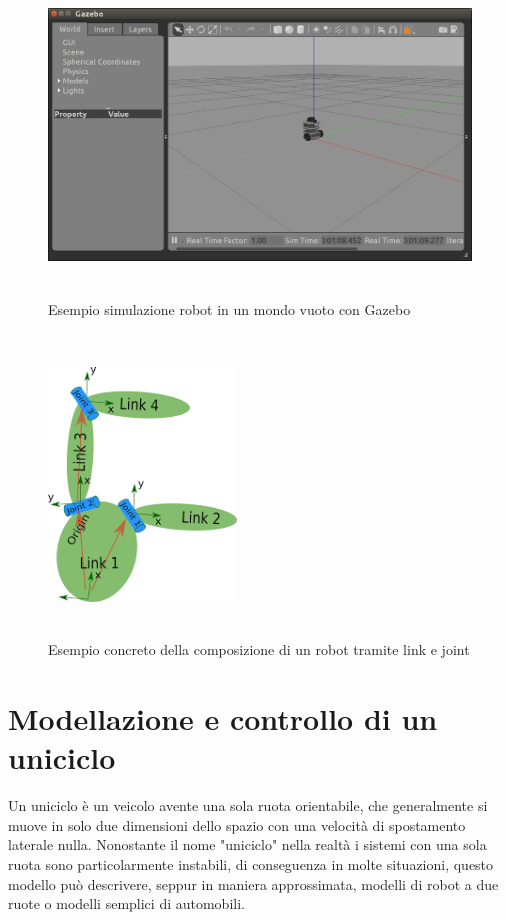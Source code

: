 \documentclass[a4paper,11 pt,oneside]{book}
\theoremstyle{definition}
\begin{document}
\begin{figure}[!ht]
\centering
\includegraphics[width=14cm, height=8.5cm]{gazebo1.jpg}
\caption{Esempio simulazione robot in un mondo vuoto con Gazebo}
\label{fig}
\end{figure}

\begin{figure}[!ht]
\centering
\includegraphics[width=5cm, height=8cm]{urdf1.png}
\caption{Esempio concreto della composizione di un robot tramite link e joint}
\label{urdf}
\end{figure}

\chapter{Modellazione e controllo di un uniciclo}

Un uniciclo è un veicolo avente una sola ruota orientabile, che generalmente si muove in solo due dimensioni dello spazio con una velocità di spostamento laterale nulla.
Nonostante il nome "uniciclo" nella realtà i sistemi con una sola ruota sono particolarmente instabili, di conseguenza in molte situazioni, questo modello può descrivere, seppur in maniera approssimata, modelli di robot a due ruote o modelli semplici di automobili.
\end{document}
